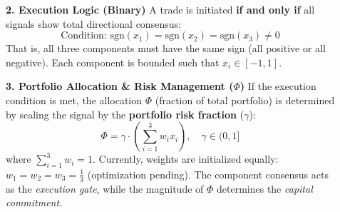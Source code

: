 \documentclass[final]{beamer}
\newlength{\sepwidth}
\newlength{\colwidth}
\newcommand{\separatorcolumn}{\begin{column}{\sepwidth}\end{column}}
\begin{document}
\begin{frame}[t]
\begin{columns}[t]
\begin{column}{\colwidth}
\end{column}


\separatorcolumn









\begin{column}{\colwidth}

  \begin{block}

    \textbf{2. Execution Logic (Binary)}
    A trade is initiated \textbf{if and only if} all signals show total directional consensus:
    \[ \text{Condition: } \text{sgn}(x_1) = \text{sgn}(x_2) = \text{sgn}(x_3) \neq 0 \]
    That is, all three components must have the same sign (all positive or all negative). Each component is bounded such that $x_i \in [-1, 1]$.

    \textbf{3. Portfolio Allocation \& Risk Management ($\Phi$)}
    If the execution condition is met, the allocation $\Phi$ (fraction of total portfolio) is determined by scaling the signal by the \textbf{portfolio risk fraction} ($\gamma$):
    \[ \Phi = \gamma \cdot \left( \sum_{i=1}^{3} w_i x_i \right), \quad \gamma \in (0, 1] \]
where $\sum_{i=1}^{3} w_i = 1$. Currently, weights are initialized equally: $w_1 = w_2 = w_3 = \frac{1}{3}$ (optimization pending).
    The component consensus acts as the \textit{execution gate}, while the magnitude of $\Phi$ determines the \textit{capital commitment}.

  \end{block}


\end{column}
\end{columns}
\end{frame}
\end{document}
